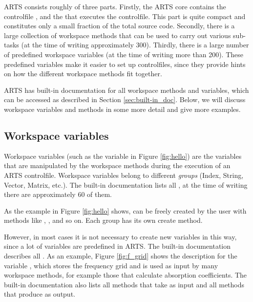 ARTS consists roughly of three parts. Firstly, the ARTS core contains the
controlfile , and the  that executes the controlfile. This part is
quite compact and constitutes only a small fraction of the total source code.
Secondly, there is a large collection of workspace methods that can be used to
carry out various sub-tasks (at the time of writing approximately 300).
Thirdly, there is a large number of predefined workspace variables (at the time
of writing more than 200). These predefined variables make it easier to set up
controlfiles, since they provide hints on how the different workspace methods
fit together.

ARTS has built-in documentation for all workspace methods and
variables, which can be accessed as described in Section
\ref{sec:built-in_doc}.  Below, we will discuss workspace variables
and methods in some more detail and give more examples.

\subsection{Workspace variables}

Workspace variables (such as the variable  in Figure
\ref{fig:hello}) are the variables that are manipulated by the
workspace methods during the execution of an ARTS
controlfile. Workspace variables belong to different \emph{groups}
(Index, String, Vector, Matrix, etc.). The built-in documentation
lists all , at the time of writing there are
approximately 60 of them.

As the example in Figure \ref{fig:hello} shows,  can be freely created by the user with methods like
, , and so on.
Each group has its own create method.

However, in most cases it is not necessary to create new variables in
this way, since a lot of variables are predefined in ARTS. The
built-in documentation describes all . As an example, Figure \ref{fig:f_grid} shows the
description for the variable , which stores the
frequency grid and is used as input by many workspace methods, for
example those that calculate absorption coefficients. The built-in
documentation also lists all methods that take  as
input and all methods that produce  as output.


